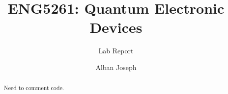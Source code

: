 \documentclass{report}
\title{ENG5261: Quantum Electronic Devices}
\author{Lab Report}
\date{Alban Joseph}
\begin{document}
\maketitle

\begin{abstract}
Need to comment code.
\end{abstract}






\end{document}
